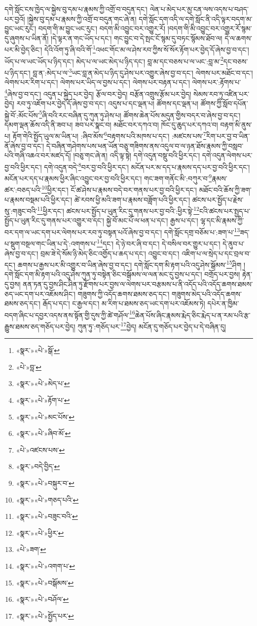 དགེ་སློང་ངས་ཁྱེད་ལ་སྐྱེས་བུ་དམ་པ་རྣམས་ཀྱི་འགྲོ་བ་བདུན་དང་། ལེན་པ་མེད་པར་མྱ་ངན་ལས་འདས་པ་བཤད་པར་བྱའོ། །སྐྱེས་བུ་དམ་པ་རྣམས་ཀྱི་འགྲོ་བ་བདུན་གང་ཞེ་ན། དགེ་སློང་དག་འདི་ལ་དགེ་སློང་ནི་འདི་ལྟར་བདག་མ་བྱུང་ཡང་རུང་། བདག་གི་མ་བྱུང་ཡང་རུང་། བདག་མི་འབྱུང་བར་འགྱུར་རོ། །བདག་གི་མི་འབྱུང་བར་འགྱུར་རོ་སྙམ་དུ་ཞུགས་པ་ཡིན་ནོ། །དེ་ལྟར་ན་གང་ཡོད་པ་དང་། གང་བྱུང་བ་དེ་སྤང་ངོ་སྙམ་དུ་བཏང་སྙོམས་ཐོབ་ལ། དེ་ལ་ཆགས་པར་མི་བྱེད་ཅིང་། དེའི་འོག་ཏུ་ཞི་བའི་གོ་\footnote{«སྣར་»«པེ་»སྒོ་}འཕང་གོང་མ་ལ་ཤེས་རབ་ཀྱིས་སོ་སོར་རྟོག་པར་བྱེད་དོ་ཞེས་བྱ་བ་དང་། ཡོད་པ་ལ་ཡང་ཡོད་པ་ཉིད་དང་། མེད་པ་ལ་ཡང་མེད་པ་ཉིད་དང་། བླ་མ་དང་བཅས་པ་ལ་ཡང་:བླ་མ་\footnote{«པེ་»བླ་}དང་བཅས་པ་ཉིད་དང་། བླ་ན་:མེད་པ་ལ་\footnote{«སྣར་»«པེ་»མེད་པ་}ཡང་བླ་ན་མེད་པ་ཉིད་དུ་ཤེས་པར་འགྱུར་ཞེས་བྱ་བ་དང་། ལེགས་པར་མཐོང་བ་དང་། ལེགས་པར་རིག་པ་དང་། ལེགས་པར་ཡིད་ལ་བྱས་པ་དང་། ལེགས་པར་བརྟན་པ་དང་། ལེགས་པར་:རྟོགས་པ་\footnote{«སྣར་»«པེ་»རྟོག་པ་}ཞེས་བྱ་བ་དང་། འདུན་པ་སྐྱེད་པར་བྱེད། རྩོལ་བར་བྱེད། བརྩོན་འགྲུས་རྩོམ་པར་བྱེད། སེམས་རབ་ཏུ་འཛིན་པར་བྱེད། རབ་ཏུ་འཇོག་པར་བྱེད་དོ་ཞེས་བྱ་བ་དང་། འདུས་པ་དང་ལྡན་པ། ཚོགས་དང་ལྡན་པ། ཚོགས་ཀྱི་སློབ་དཔོན་སྐྱེ་བོ་:མོང་པོས་\footnote{«སྣར་»«པེ་»མང་པོས་}ཞི་བའི་རང་བཞིན་དུ་ཀུན་ཏུ་ཤེས་པ། ཚོགས་ཆེན་པོས་མདུན་གྱིས་བདར་བ་ཞེས་བྱ་བ་དང་། དམག་ལྡན་ཆོས་འདི་ནི་ཟབ་པ། ཟབ་པར་སྣང་བ། མཐོང་བར་དཀའ་བ། ཁོང་དུ་ཆུད་པར་དཀའ་བ། བརྟག་མི་ནུས་པ། རྟོག་གེའི་སྤྱོད་ཡུལ་མ་ཡིན་པ། :ཞིབ་མོས་\footnote{«སྣར་»«པེ་»ཞིབ་མོ་}བརྟགས་པའི་མཁས་པ་དང་། :མཛངས་པས་\footnote{«པེ་»འཛངས་པས་}རིག་པར་བྱ་བ་ཡིན་ནོ་ཞེས་བྱ་བ་དང་། དེ་བཞིན་གཤེགས་པས་ཕན་ཡོན་བཅུ་གཟིགས་ནས་འདུལ་བ་ལ་ཉན་ཐོས་རྣམས་ཀྱི་བསླབ་པའི་གཞི་འཆའ་བར་མཛད་དོ། །བཅུ་གང་ཞེ་ན། འདི་ལྟ་སྟེ། དགེ་འདུན་བསྡུ་བའི་ཕྱིར་དང་། དགེ་འདུན་ལེགས་པར་བྱ་བའི་ཕྱིར་དང་། དགེ་འདུན་བདེ་\footnote{«སྣར་»བདེ་བྱིད་}བར་བྱ་བའི་ཕྱིར་དང་། མངོན་པར་མ་དད་པ་རྣམས་དད་པར་བྱ་བའི་ཕྱིར་དང་། མངོན་པར་དད་པ་རྣམས་ཕྱིར་ཞིང་འབྱུང་བར་བྱ་བའི་ཕྱིར་དང་། གང་ཟག་གནོང་མི་:བཀུར་བ་\footnote{«སྣར་»«པེ་»བསྐུར་བ་}རྣམས་ཚར་:བཅད་པའི་\footnote{«སྣར་»«པེ་»གཅད་པའི་}ཕྱིར་དང་། ངོ་ཚ་ཤེས་པ་རྣམས་བདེ་བར་གནས་པར་བྱ་བའི་ཕྱིར་དང་། མཐོང་བའི་ཆོས་ཀྱི་ཟག་པ་རྣམས་བསྡམ་པའི་ཕྱིར་དང་། ཚེ་རབས་ཕྱི་མའི་ཟག་པ་རྣམས་བཟློག་པའི་ཕྱིར་དང་། ཚངས་པར་སྤྱོད་པ་རྗེས་སུ་:གཟུང་བའི་\footnote{«སྣར་»«པེ་»བཟུང་བའི་}ཕྱིར་དང་། ཚངས་པར་སྤྱོད་པ་ཡུན་རིང་དུ་གནས་པར་བྱ་བའི་:ཕྱིར་སྟེ་\footnote{«སྣར་»«པེ་»ཕྱིར་}ངའི་ཚངས་པར་སྤྱད་པ་སྤྱོད་པ་ཡུན་རིང་དུ་གནས་པར་འགྱུར་བ་དང་། སྐྱེ་བོ་མང་པོ་ལ་ཕན་པ་དང་། རྒྱས་པ་དང་། ལྷ་དང་མི་རྣམས་ཀྱི་བར་དག་ལ་ཡང་དག་པར་ལེགས་པར་རབ་ཏུ་བསྟན་པའོ་ཞེས་བྱ་བ་དང་། དགེ་སློང་དགྲ་བཅོམ་པ་:ཟག་པ་\footnote{«པེ་»ཟག་}ཟད་པ་སྡུག་བསྔལ་གང་ཡིན་པ་དེ་:འགགས་པ་\footnote{«སྣར་»«པེ་»འགག་པ་}དང་། དེ་ཉེ་བར་ཞི་བ་དང་། དེ་བསིལ་བར་གྱུར་པ་དང་། དེ་ནུབ་པ་ཞེས་བྱ་བ་དང་། བྲམ་ཟེ་དེ་སོམ་ཉི་མེད་ཅིང་འགྱོད་པ་ཆད་པ་དང་། འབྱུང་བ་དང་། འཇིག་པ་ལ་སྲེད་པ་དང་བྲལ་བ་དང་། ཆགས་པ་རྒྱས་པར་མི་འགྱུར་བ་ཡིན་ཞེས་བྱ་བ་དང་། དགེ་སློང་དག་མི་རྟག་པའི་འདུ་ཤེས་སྒོམས་\footnote{«སྣར་»«པེ་»བསྒོམས་}ཤིག །དགེ་སློང་དག་མི་རྟག་པའི་འདུ་ཤེས་ཀུན་ཏུ་བསྟེན་ཅིང་བསྒོམས་ལ་ལན་མང་དུ་བྱས་པ་དང་། བགྲོད་པར་བྱས། རྟེན་དུ་བྱས། ནན་ཏན་དུ་བྱས་ཤིང་ཤིན་ཏུ་རྫོགས་པར་བྱས་ལ་ལེགས་པར་བརྩམས་པ་ནི་འདོད་པའི་འདོད་ཆགས་ཐམས་ཅད་ཡང་དག་པར་འཇོམས་ཤིང་། གཟུགས་ཀྱི་འདོད་ཆགས་ཐམས་ཅད་དང་། གཟུགས་མེད་པའི་འདོད་ཆགས་ཐམས་ཅད་དང་། རྒོད་པ་དང་། ང་རྒྱལ་དང་། མ་རིག་པ་ཐམས་ཅད་ཡང་དག་པར་འཇོམས་ཏེ། དཔེར་ན་ཁྱིམ་བདག་ཞིང་པ་དབྱར་འདས་ནས་སྟོན་གྱི་དུས་ཀྱི་ཚེ་གཤོལ་\footnote{«སྣར་»«པེ་»བཤོལ་}ཆེན་པོས་ཞིང་རྣམས་རྨེད་ཅིང་རྨེད་པ་ན་རམ་པའི་རྩ་རྒྱུས་ཐམས་ཅད་གཅོད་པར་བྱེད། ཀུན་ཏུ་:གཅོད་པར་\footnote{«སྣར་»«པེ་»སྤྱོད་པར་}བྱེད། མངོན་དུ་གཅོད་པར་བྱེད་པ་དེ་བཞིན་དུ། 